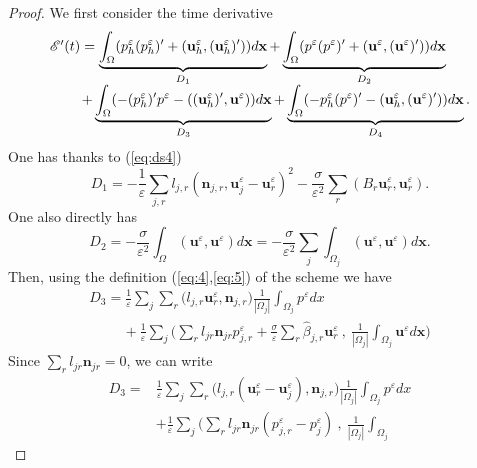 \documentclass[a4paper,french,english,10pt]{article}
\newcommand\uu{\mathbf{u}}
\newcommand\eps{\varepsilon}
\newcommand\x{\mathbf{x}}
\begin{document}
\begin{proof}
We first consider  the time  derivative
\begin{equation*} \label{eq:eetoile}
\begin{array}{l}
\mathscr{E}'(t)
=\underbrace{\int_{\Omega}(p_h^{\eps}(p_h^{\eps})'+(\uu_h^{\eps},(\textbf{u}
_h^{\eps})'))d\x}_{D_1}+ \underbrace{
\int_{\Omega}(p^{\eps}(p^{\eps})'+(\textbf{u}^{\eps},(\textbf{u}^{\eps})'))d\x}_{
D_2} \\
\hspace{0.8cm}+ \underbrace{\int_{\Omega}
(-(p_h^{\eps})'p^{\eps}-((\textbf{u}_h^{\eps})',\textbf{u}^{\eps}))d\x}_{D_3} 
+ \underbrace{\int_{\Omega}
(-p_h^{\eps}(p^{\eps})'-(\textbf{u}_h^{\eps},(\textbf{u}^{\eps})'))d\x}_{D_4}.
\end{array}
\end{equation*}
One has thanks to  (\ref{eq:ds4})
$$
D_1
=-\frac{1}{\eps}\sum_{j,r}l_{j,r}(\textbf{n}_{j,r},\textbf{u}_j^{\eps}-\textbf{u}
_r^{\eps})^2-\frac{\sigma}{\eps^2}\sum_{r}
( B_r\textbf{u}_r^{\eps},\textbf{u}_r^{\eps}).
$$
One also directly has
\begin{equation*}
D_2 =
-\frac{\sigma}{\eps^2}\int_{\Omega}(\uu^{\eps},\uu^{\eps})d\x =
-\frac{\sigma}{\eps^2}\sum_j\int_{\Omega_j}(\uu^{\eps},\uu^{\eps}
)d\x.
\end{equation*}
Then,  using the  definition (\ref{eq:4},\ref{eq:5}) of the scheme we have
\begin{equation*}
\begin{array}{l}
D_3 = \frac{1}{\eps} \sum_j \sum_r \bigg(
l_{j,r}\textbf{u}_r^{\eps},\textbf{n}_{j,r} \bigg) 
\frac{1}{|\Omega_j|}\int_{\Omega_j} p^{\eps} dx \\
\hspace{1cm}+\frac{1}{\eps} \sum_j \bigg( \sum_r
l_{jr} \mathbf n_{jr} p_{j,r}^{\eps}+\frac{\sigma}{\eps} \sum_r
\widehat{\beta}_{j,r}\textbf{u}_r^{\eps}  \: , \:
\frac{1}{|\Omega_j|}\int_{\Omega_j} \uu^{\eps} d\x \bigg) 
\end{array}
\end{equation*}
Since $\sum_r l_{jr} \mathbf n_{jr}=0$,  we can write
\begin{equation*}
\begin{array}{ll}
D_3= &  \frac{1}{\eps} \sum_j \sum_r \bigg(
l_{j,r}(\textbf{u}_r^{\eps}-\textbf{u}_j^{\eps}),\textbf{n}_{j,r} \bigg) 
\frac{1}{|\Omega_j|}\int_{\Omega_j} p^{\eps} dx \\
& + \frac{1}{\eps} \sum_j \bigg( \sum_r 
l_{jr} \mathbf n_{jr} (p_{j,r}^{\eps}
-
p_j^{\eps})  \: , \: \frac{1}{|\Omega_j|}\int_{\Omega_j}

\end{array}
\end{equation*}
\end{proof}
\end{document}
